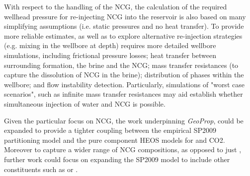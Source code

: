     With respect to the handling of the \ac{NCG}, the calculation of the required wellhead pressure for re-injecting \ac{NCG} into the reservoir is also based on many simplifying assumptions (i.e. static pressures and no heat transfer). To provide more reliable estimates, as well as to explore alternative re-injection strategies (e.g. mixing in the wellbore at depth) requires more detailed wellbore simulations, including frictional pressure losses; heat transfer between surrounding formation, the brine and the \ac{NCG}; mass transfer resistances (to capture the dissolution of \ac{NCG} in the brine); distribution of phases within the wellbore; and flow instability detection. Particularly, simulations of "worst case scenarios", such as infinite mass transfer resistances may aid establish whether simultaneous injection of water and \ac{NCG} is possible.

    Given the particular focus on \ac{NCG}, the work underpinning \emph{GeoProp}, could be expanded to provide a tighter coupling between the empirical \ac{SP2009} partitioning model and the pure component \ac{HEOS} models for  and \ac{CO2}. Moreover to capture a wider range of \ac{NCG} compositions, as opposed to just , further work could focus on expanding the \ac{SP2009} model to include other constituents such as  or .
